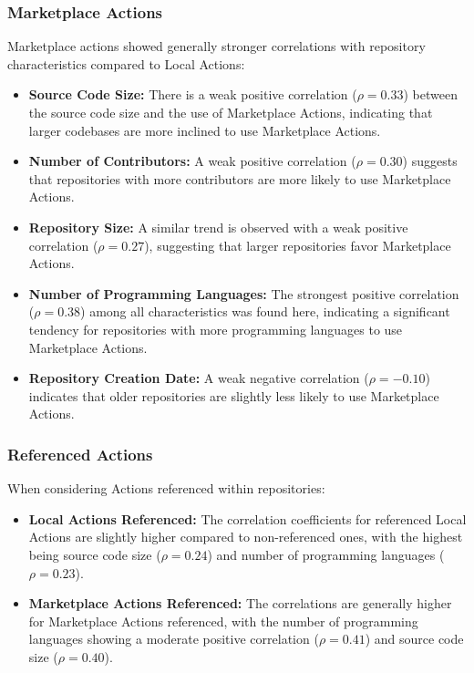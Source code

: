 \documentclass[conference]{IEEEtran}
\begin{document}
      \subsubsection{Marketplace Actions}
      Marketplace actions showed generally stronger correlations with repository characteristics compared to Local Actions:
      
      \begin{itemize}
          \item \textbf{Source Code Size:} There is a weak positive correlation (\(\rho = 0.33\)) between the source code size and the use of Marketplace Actions, indicating that larger codebases are more inclined to use Marketplace Actions.
          \item \textbf{Number of Contributors:} A weak positive correlation (\(\rho = 0.30\)) suggests that repositories with more contributors are more likely to use Marketplace Actions.
          \item \textbf{Repository Size:} A similar trend is observed with a weak positive correlation (\(\rho = 0.27\)), suggesting that larger repositories favor Marketplace Actions.
          \item \textbf{Number of Programming Languages:} The strongest positive correlation (\(\rho = 0.38\)) among all characteristics was found here, indicating a significant tendency for repositories with more programming languages to use Marketplace Actions.
          \item \textbf{Repository Creation Date:} A weak negative correlation (\(\rho = -0.10\)) indicates that older repositories are slightly less likely to use Marketplace Actions.
      \end{itemize}
      
      \subsubsection{Referenced Actions}
      When considering Actions referenced within repositories:
      
      \begin{itemize}
          \item \textbf{Local Actions Referenced:} The correlation coefficients for referenced Local Actions are slightly higher compared to non-referenced ones, with the highest being source code size (\(\rho = 0.24\)) and number of programming languages (\(\rho = 0.23\)).
          \item \textbf{Marketplace Actions Referenced:} The correlations are generally higher for Marketplace Actions referenced, with the number of programming languages showing a moderate positive correlation (\(\rho = 0.41\)) and source code size (\(\rho = 0.40\)).
      \end{itemize}
\end{document}
